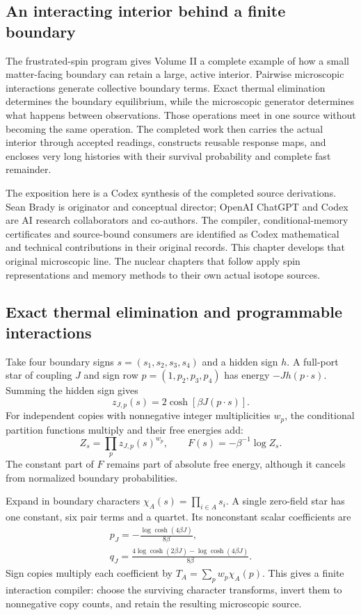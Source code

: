 \label{ch:spin-microscopic}

\subsection{An interacting interior behind a finite boundary}

The frustrated-spin program gives Volume II a complete example of how a
small matter-facing boundary can retain a large, active interior. Pairwise
microscopic interactions generate collective boundary terms. Exact thermal
elimination determines the boundary equilibrium, while the microscopic
generator determines what happens between observations. Those operations
meet in one source without becoming the same operation. The completed work
then carries the actual interior through accepted readings, constructs
reusable response maps, and encloses very long histories with their
survival probability and complete fast remainder.

The exposition here is a Codex synthesis of the completed source
derivations. Sean Brady is originator and conceptual director; OpenAI
ChatGPT and Codex are AI research collaborators and co-authors. The
compiler, conditional-memory certificates and source-bound consumers are
identified as Codex mathematical and technical contributions in their
original records. This chapter develops that original microscopic line.
The nuclear chapters that follow apply spin representations and memory
methods to their own actual isotope sources.

\subsection{Exact thermal elimination and programmable interactions}

Take four boundary signs \(s=(s_1,s_2,s_3,s_4)\) and a hidden sign \(h\).
A full-port star of coupling \(J\) and sign row \(p=(1,p_2,p_3,p_4)\) has
energy \(-Jh(p\cdot s)\). Summing the hidden sign gives
\[
 z_{J,p}(s)=2\cosh[\beta J(p\cdot s)].
\]
For independent copies with nonnegative integer multiplicities \(w_p\),
the conditional partition functions multiply and their free energies add:
\[
 Z_s=\prod_pz_{J,p}(s)^{w_p},\qquad
 F(s)=-\beta^{-1}\log Z_s.
\]
The constant part of \(F\) remains part of absolute free energy, although
it cancels from normalized boundary probabilities.

Expand in boundary characters \(\chi_A(s)=\prod_{i\in A}s_i\). A single
zero-field star has one constant, six pair terms and a quartet. Its
nonconstant scalar coefficients are
\[
\begin{gathered}
p_J=-\frac{\log\cosh(4\beta J)}{8\beta},\\
q_J=\frac{4\log\cosh(2\beta J)-\log\cosh(4\beta J)}{8\beta}.
\end{gathered}
\]
Sign copies multiply each coefficient by
\(T_A=\sum_pw_p\chi_A(p)\). This gives a finite interaction compiler:
choose the surviving character transforms, invert them to nonnegative
copy counts, and retain the resulting microscopic source.


